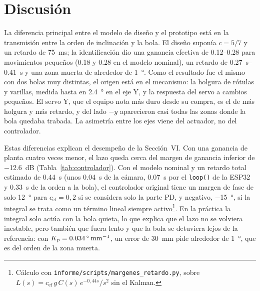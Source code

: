 \section{Discusión}

La diferencia principal entre el modelo de diseño y el prototipo está en la transmisión entre la
orden de inclinación y la bola. El diseño suponía $c = 5/7$ y un retardo de
\SI{75}{\milli\second}; la identificación dio una ganancia efectiva de \numrange{0.12}{0.28} para
movimientos pequeños (\num{0.18} y \num{0.28} en el modelo nominal), un retardo de \SIrange{0.27}{0.41}{\second} y una zona muerta de alrededor
de \SI{1}{\degree}. Como el resultado fue el mismo con dos bolas muy distintas, el origen está en
el mecanismo: la holgura de rótulas y varillas, medida hasta en \SI{2.4}{\degree} en el eje Y, y
la respuesta del servo a cambios pequeños. El servo Y, que el equipo nota más duro desde su
compra, es el de más holgura y más retardo, y del lado $-y$ aparecieron casi todas las zonas
donde la bola quedaba trabada. La asimetría entre los ejes viene del actuador, no del
controlador.

Estas diferencias explican el desempeño de la Sección~VI. Con una ganancia de planta cuatro veces
menor, el lazo queda cerca del margen de ganancia inferior de \SI{-12.6}{\deci\bel}
(Tabla~\ref{tab:controlador}). Con el modelo nominal y un retardo total estimado de
\SI{0.44}{\second} (unos \SI{0.04}{\second} de la cámara, \SI{0.07}{\second} por el
\texttt{loop()} de la ESP32 y \SI{0.33}{\second} de la orden a la bola), el controlador original
tiene un margen de fase de solo \SI{12}{\degree} para $c_{\mathrm{ef}} = 0{,}2$ si se considera
solo la parte PD, y negativo, \SI{-15}{\degree}, si la integral se trata como un término lineal
siempre activo\footnote{Cálculo con \texttt{informe/scripts/margenes\_retardo.py}, sobre
$L(s) = c_{\mathrm{ef}}\,g\,C(s)\,e^{-0{,}44 s}/s^{2}$ sin el Kalman.}. En la práctica la
integral solo actúa con la bola quieta, lo que explica que el lazo no se volviera inestable, pero
también que fuera lento y que la bola se detuviera lejos de la referencia: con
$K_p = \SI{0.034}{\degree\per\milli\metre}$, un error de \SI{30}{\milli\metre} pide alrededor de
\SI{1}{\degree}, que es del orden de la zona muerta.

